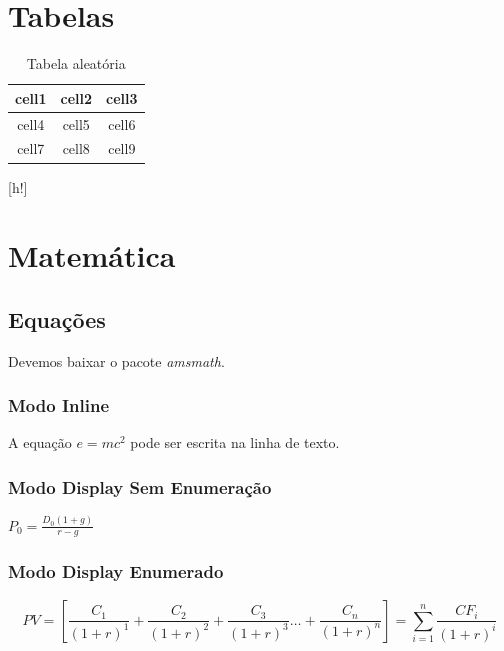 \documentclass[12pt, a4paper]{article}
\begin{document}
\section{Tabelas}

\begin{center}
    \begin{table}[h!]
        \begin{tabular}{||c|c|c||} %
         \hline
         cell1 & cell2 & cell3 \\ %
         \hline
         cell4 & cell5 & cell6 \\ %
         \hline
         cell7 & cell8 & cell9
         \hline
        \end{tabular}
    \caption{Tabela aleatória}
    \label{Tabela}
    \end{table}[h!]
\end{center}

\section{Matemática}

\subsection{Equações}
Devemos baixar o pacote \textit{amsmath}.

\subsubsection{Modo Inline}

A equação $e = mc^2$ pode ser escrita na linha de texto.

\subsubsection{Modo Display Sem Enumeração}
$P_{0}=\frac{D_{0}(1+g)}{r-g}$

\subsubsection{Modo Display Enumerado}
\begin{equation}
    PV=\left[\frac{C_{1}}{(1+r)^{1}}+\frac{C_{2}}{(1+r)^{2}}+\frac{C_{3}}{(1+r)^{3}} \ldots+\frac{C_{n}}{(1+r)^{n}}\right] = \sum^n_{i = 1} \frac{CF_{i}}{(1+r)^i}
\end{equation}
\end{document}
